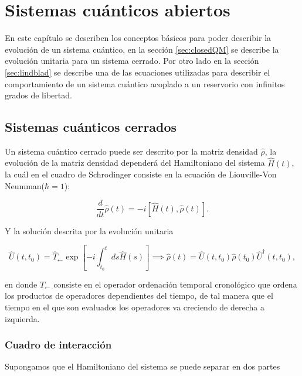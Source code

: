
\chapter{Sistemas cuánticos abiertos}

En este capítulo se describen los conceptos básicos para poder describir la evolución de un sistema cuántico, en la sección \ref{sec:closedQM} se describe la evolución unitaria para un sistema cerrado.  Por otro lado en la sección \ref{sec:lindblad} se describe una de las ecuaciones utilizadas para describir el comportamiento de un sistema cuántico acoplado a un reservorio con infinitos grados de libertad.


\section{Sistemas cuánticos cerrados}
Un sistema cuántico cerrado puede ser descrito por la matriz densidad $\hat{\rho}$, la evolución de la matriz densidad dependerá del Hamiltoniano del sistema $\hat{H}(t)$, la cuál en el cuadro de Schrodinger consiste en la ecuación de Liouville-Von Neumman($\hbar = 1$)\cite{breuer2002theory}:

\begin{equation*}
    \frac{d}{dt}\hat{\rho}(t) = -i[\hat{H}(t),\hat{\rho}(t)].
\end{equation*}

Y la solución descrita por la evolución unitaria 

\begin{equation*}
    \hat{U}(t,t_{0}) = \hat{T}_{\leftarrow} \exp \left[ -i \int_{t_{0}}^{t}ds \hat{H}(s) \right] \implies \hat{\rho}(t) = \hat{U}(t,t_{0})\hat{\rho}(t_{0})\hat{U}^{\dagger}(t,t_{0}),
\end{equation*}

en donde $\hat{T}_{\leftarrow}$ consiste en el operador ordenación temporal cronológico que ordena los productos de operadores dependientes del tiempo, de tal manera que el tiempo en el que son evaluados los operadores va creciendo de derecha a izquierda.

\subsection{Cuadro de interacción}
Supongamos que el Hamiltoniano del sistema se puede separar en dos partes

